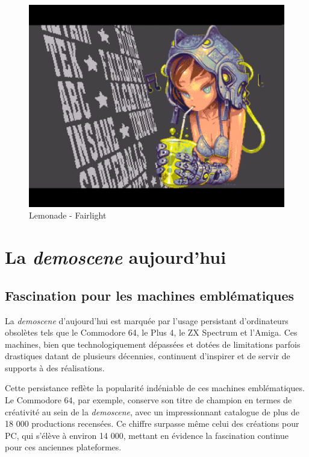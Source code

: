 \begin{figure}[h]
\begin{minipage}[b]{0.30\linewidth}
  \end{minipage}
  \hfill
  \begin{minipage}[b]{0.30\linewidth}
    \centering
    \includegraphics[width=\linewidth]{images/demoscene/demos/lemon3.png}
  \end{minipage}
  \caption{Lemonade - Fairlight}
  \label{lemon}
\end{figure}




\chapter{La \textit{demoscene} aujourd'hui}

\section{Fascination pour les machines emblématiques}

La \textit{demoscene} d'aujourd'hui est marquée par l'usage persistant d'ordinateurs obsolètes tels que le Commodore 64, le Plus 4, le ZX Spectrum et l'Amiga. Ces machines, bien que technologiquement dépassées et dotées de limitations parfois drastiques datant de plusieurs décennies, continuent d'inspirer et de servir de supports à des réalisations.

Cette persistance reflète la popularité indéniable de ces machines emblématiques. Le Commodore 64, par exemple, conserve son titre de champion en termes de créativité au sein de la \textit{demoscene}, avec un impressionnant catalogue de plus de 18 000 productions recensées. Ce chiffre surpasse même celui des créations pour PC, qui s'élève à environ 14 000, mettant en évidence la fascination continue pour ces anciennes plateformes.




